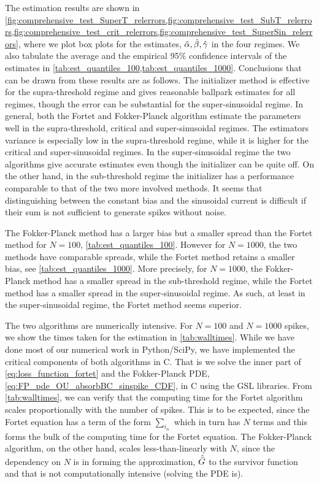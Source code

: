 The estimation results are shown in
\cref{fig:comprehensive_test_SuperT_relerrors,fig:comprehensive_test_SubT_relerrors,fig:comprehensive_test_crit_relerrors,fig:comprehensive_test_SuperSin_relerrors},
where we plot box plots for the estimates, ${{{ \hat{\alpha} }, { \hat{\beta} }, { \hat{{\gamma }} }} }$ in the four regimes. We
also tabulate the average and the empirical 95\% confidence intervals of the
estimates in \cref{tab:est_quantiles_100,tab:est_quantiles_1000}. Conclusions
that can be drawn from these results are as follows. The initializer method is
effective for the supra-threshold regime and gives reasonable ballpark estimates
for all regimes, though the error can be substantial for the super-sinusoidal
regime. In general, both the Fortet and Fokker-Planck algorithm estimate the
parameters well in the supra-threshold, critical and super-sinusoidal regimes.
The estimators variance is especially low in the supra-threshold regime, while
it is higher for the critical and super-sinusoidal regimes. In the
super-sinusoidal regime the two algorithms give accurate estimates even though
the initializer can be quite off. On the other hand, in the sub-threshold regime
the initializer has a performance comparable to that of the two more involved
methods. It seems that distinguishing between the constant bias and the
sinusoidal current is difficult if their sum is not sufficient to generate
spikes without noise.


The Fokker-Planck method has a larger bias but a smaller spread than the Fortet
method for $N=100$, \cref{tab:est_quantiles_100}. However for
$N=1000$, the two methods have comparable 
spreads, while the Fortet method retains a smaller bias, see
\cref{tab:est_quantiles_1000}. More precisely, for $N=1000$, the Fokker-Planck
method has a smaller spread in the sub-threshold regime, while the Fortet method
has a smaller spread in the super-sinusoidal regime. As such, at least in the
super-sinusoidal regime, the Fortet method seems superior.

The two algorithms are numerically intensive. For $N=100$ and $N=1000$ spikes,
we show the times taken for the estimation in \cref{tab:walltimes}. While we
have done most of our numerical work in Python/SciPy\cite{scipy}, we have
implemented the critical components of both algorithms in C. That is we solve
the inner part of \cref{eq:loss_function_fortet} and the Fokker-Planck PDE,
\cref{eq:FP_pde_OU_absorbBC_sinspike_CDF}, in C using the GSL libraries\cite{gsl}. From
\cref{tab:walltimes}, we can verify that the computing time for the Fortet
algorithm scales proportionally with the number of spikes. This is to be
expected, since the Fortet equation has a term of the form $\sum_{i_n}$ which in
turn has $N$ terms and this forms the bulk of the computing time for the
Fortet equation. The Fokker-Planck algorithm, on the other hand, scales
less-than-linearly with $N$, since the dependency on $N$ is in forming the
approximation, ${ \hat{{ \bar{G} }} }$ to the survivor function and that is not computationally
intensive (solving the PDE is).


